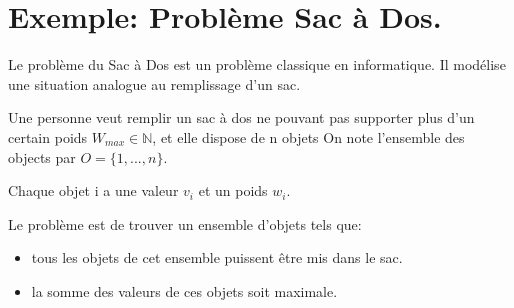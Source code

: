 \documentclass[letterpaper,10pt,english]{jupyterBook}
\begin{document}
\section{Exemple: Problème Sac à Dos.}
\label{\detokenize{notebooks/dynamicProgramming/ProgrammationDynamique:exemple-probleme-sac-a-dos}}
\sphinxAtStartPar
Le problème du Sac à Dos est un problème classique en informatique. Il modélise une situation analogue au remplissage d’un sac.

\sphinxAtStartPar
Une personne veut remplir un sac à dos ne pouvant pas supporter plus d’un certain poids \(W_{max}\in \mathbb{N}\), et elle dispose de n objets On note l’ensemble des objects par \(O = \{1, . . . , n\}\).

\sphinxAtStartPar
Chaque objet i a une valeur \(v_ i\) et un poids \(w_i\).

\sphinxAtStartPar
Le problème est de trouver un ensemble d’objets tels que:
\begin{itemize}
\item {} 
\sphinxAtStartPar
tous les objets de cet ensemble puissent être mis dans le sac.

\item {} 
\sphinxAtStartPar
la somme des valeurs de ces objets soit maximale.

\end{itemize}
\end{document}
